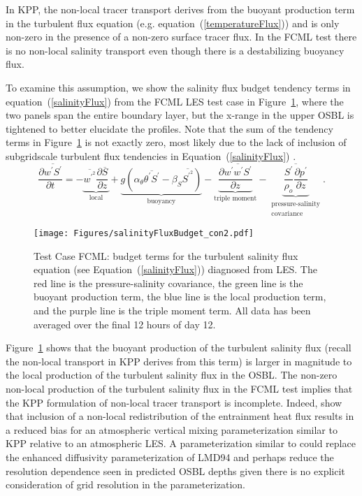 \documentclass[preprint,12pt,authoryear]{agujournal}
\begin{document}
In KPP, the non-local tracer transport derives from the buoyant production term in the turbulent flux equation (e.g. equation~(\ref{temperatureFlux})) and is only non-zero in the presence of a non-zero surface tracer flux.  In the FCML test there is no non-local salinity transport even though there is a destabilizing buoyancy flux.

To examine this assumption, we show the salinity flux budget tendency terms in equation~(\ref{salinityFlux}) from the FCML LES test case in Figure~\ref{convect3_salinityFluxBudget}, where the two panels span the entire boundary layer, but the x-range in the upper OSBL is tightened to better elucidate the profiles.  Note that the sum of the tendency terms in Figure~\ref{convect3_salinityFluxBudget} is not exactly zero, most likely due to the lack of inclusion of subgridscale turbulent flux tendencies in Equation~(\ref{salinityFlux}) \citep{Mironov:2001gh}. 
\begin{equation}
\label{salinityFlux}
\frac{\partial \overline{w^\prime S^\prime}}{\partial t} =  -\underbrace{\overline{w^{\prime^2}} \frac{\partial \overline{S}}{\partial z}}_\textrm{local} + \underbrace{g \left(\alpha_\theta \overline{\theta^\prime S^\prime} - \beta_S \overline{S^{\prime^2}}\right)}_\textrm{buoyancy} - \underbrace{\frac{\partial \overline{w^\prime w^\prime S^\prime}}{\partial z}}_\textrm{triple moment} - \underbrace{\overline{\frac{S^\prime}{\rho_o}\frac{\partial p^\prime}{\partial z}}}_{\substack{\textrm{pressure-salinity}\\
\textrm{covariance}}}.
\end{equation}
\begin{figure}[hbtp]
\centering\texttt{[image: Figures/salinityFluxBudget\_con2.pdf]}
\caption{Test Case FCML: budget terms for the turbulent salinity flux equation (see Equation~(\ref{salinityFlux})) diagnosed from LES.  The red line is the pressure-salinity covariance, the green line is the buoyant production term, the blue line is the local production term, and the purple line is the triple moment term.  All data has been averaged over the final 12 hours of day 12.}
\label{convect3_salinityFluxBudget}
\end{figure}
Figure~\ref{convect3_salinityFluxBudget} shows that the buoyant production of the turbulent salinity flux (recall the non-local transport in KPP derives from this term) is larger in magnitude to the local production of the turbulent salinity flux in the OSBL.  The non-zero non-local production of the turbulent salinity flux in the FCML test implies that the KPP formulation of non-local tracer transport is incomplete.  Indeed, \cite{Noh2003} show that inclusion of a non-local redistribution of the entrainment heat flux results in a reduced bias for an atmospheric vertical mixing parameterization similar to KPP relative to an atmospheric LES. A parameterization similar to \cite{Noh2003} could replace the enhanced diffusivity parameterization of LMD94 and perhaps reduce the resolution dependence seen in predicted OSBL depths given there is no explicit consideration of grid resolution in the \cite{Noh2003} parameterization.
\end{document}

